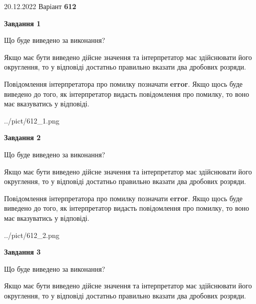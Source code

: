 \documentclass[12pt, ukrainian]{article}
\begin{document}
{20.12.2022 Варіант \No \textbf { 612 }\par}
{
\begin {Large}

{\begin {center}\textbf{Завдання 1}\end {center}}\par
Що буде виведено за виконання? \par

Якщо має бути виведено дійсне значення та інтерпретатор має здійснювати його округлення, 
то у відповіді достатньо правильно вказати два дробових розряди.

Повідомлення інтерпретатора про помилку позначати \textbf{error}.
Якщо щось буде виведено до того, як інтерпретатор видасть повідомлення про помилку, 
то воно має вказуватись у відповіді. \par

\begin{center}
	{../pict/612_1.png}
\end{center}
\newpage

{\begin {center}\textbf{Завдання 2}\end {center}}\par
Що буде виведено за виконання? \par

Якщо має бути виведено дійсне значення та інтерпретатор має здійснювати його округлення, 
то у відповіді достатньо правильно вказати два дробових розряди.

Повідомлення інтерпретатора про помилку позначати \textbf{error}.
Якщо щось буде виведено до того, як інтерпретатор видасть повідомлення про помилку, 
то воно має вказуватись у відповіді. \par

\begin{center}
	{../pict/612_2.png}
\end{center}
\newpage

{\begin {center}\textbf{Завдання 3}\end {center}}\par
Що буде виведено за виконання? \par

Якщо має бути виведено дійсне значення та інтерпретатор має здійснювати його округлення, 
то у відповіді достатньо правильно вказати два дробових розряди.


\end{Large}}
\end{document}
